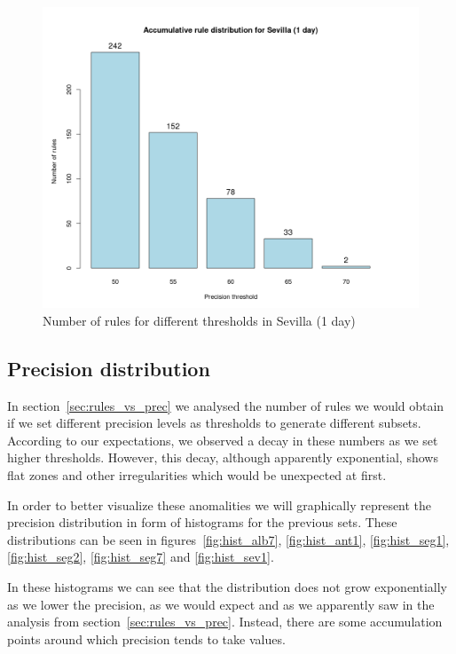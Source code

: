\begin{figure}[hbtp]
\includegraphics[width=\textwidth]{img/precision_sev1.png}
\caption{Number of rules for different thresholds in Sevilla (1 day)} \label{fig:precision_sev1}
\end{figure}

\clearpage

\subsection{Precision distribution}
\label{sec:precision_distribution}
In section~\ref{sec:rules_vs_prec} we analysed the number of rules we would obtain if we set different precision levels as thresholds to generate different subsets. According to our expectations, we observed a decay in these numbers as we set higher thresholds. However, this decay, although apparently exponential, shows flat zones and other irregularities which would be unexpected at first.

In order to better visualize these anomalities we will graphically represent the precision distribution in form of histograms for the previous sets. These distributions can be seen in figures~\ref{fig:hist_alb7}, \ref{fig:hist_ant1}, \ref{fig:hist_seg1}, \ref{fig:hist_seg2}, \ref{fig:hist_seg7} and \ref{fig:hist_sev1}.

In these histograms we can see that the distribution does not grow exponentially as we lower the precision, as we would expect and as we apparently saw in the analysis from section~\ref{sec:rules_vs_prec}. Instead, there are some accumulation points around which precision tends to take values. 

